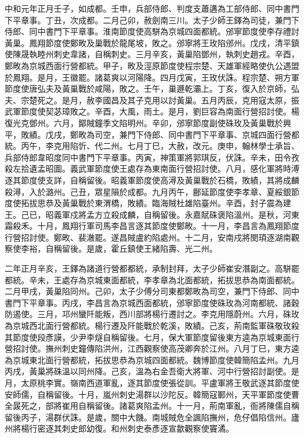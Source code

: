 \begin{pinyinscope}
 中和元年正月壬子，如成都。壬申，兵部侍郎、判度支蕭遘為工部侍郎、同中書門下平章事。丁丑，次成都。二月己卯，赦劍南三川。太子少師王鐸為司徒，兼門下侍郎、同中書門下平章事。淮南節度使高駢為京城四面都統。邠寧節度使李存禮討黃巢。鳳翔節度使鄭畋及巢戰於龍尾坡，敗之。邠寧將王玫陷邠州。戊戌，清平鎮使陳晟執睦州刺史韋諸，自稱刺史。三月辛亥，黃巢陷鄧州，執刺史趙戎。辛酉，鄭畋為京城西面行營都統。甲子，畋及涇原節度使程宗楚、天雄軍經略使仇公遇盟於鳳翔。是月，王徽罷。諸葛爽以河陽降。四月戊寅，王玫伏誅。程宗楚、朔方軍節度使唐弘夫及黃巢戰於咸陽，敗之。壬午，巢遯乾灞上。丁亥，復入於京師，弘夫、宗楚死之。是月，赦李國昌及其子克用以討黃巢。五月丙辰，克用寇太原，振武軍節度使契苾璋敗之。辛酉，大風，雨土。是月，劉巨容為南面行營招討使。楊復光克鄧州。六月，鄮賊鐘季文陷明州。辛卯，邠寧節度副使硃玫及黃巢戰於興平，敗績。戊戌，鄭畋為司空，兼門下侍郎、同中書門下平章事、京城四面行營都統。丙午，李克用陷忻、代二州。七月丁巳，大赦，改元。庚申，翰林學士承旨、兵部侍郎韋昭度同中書門下平章事。丙寅，神策軍將郭琪反，伏誅。辛未，田令孜殺左拾遺孟昭圖。義武軍節度使王處存為東南面行營招討使。八月，感化軍將時溥逐其節度使支詳，自稱留後。昭義軍節度使高潯及黃巢戰於石橋，敗績，其將成麟殺潯，入於潞州。己丑，眾星隕於成都。九月丙午，鄜延節度使李孝章、夏綏銀節度使拓拔思恭及黃巢戰於東渭橋，敗績。臨海賊杜雄陷臺州。辛酉，封子震為建王。己已，昭義軍戍將孟方立殺成麟，自稱留後。永嘉賦硃褒陷溫州。是秋，河東霜殺禾。十月，鳳翔行軍司馬李昌言逐其節度使鄭畋。十一月，李昌言為鳳翔節度行營招討使。鄭畋、裴澈罷。遂昌賊盧約陷處州。十二月，安南戍將閔頊逐湖南觀察使李裕，自稱留後。是歲，霍丘鎮使王緒陷壽、光二州。



 二年正月辛亥，王鐸為諸道行營都都統，承制封拜，太子少師崔安潛副之。高駢罷都統。辛未，王處存為京城東面都統，李孝章為北面都統，拓拔思恭為南面都統。二月甲戌，黃巢陷同州。己卯，太子少傅分司東都鄭畋為司空，兼門下侍郎、同中書門下平章事。丙戌，李昌言為京城西面都統，邠寧節度使硃玫為河南都統、諸穀防遏使。三月，邛州蠻阡能叛，西川部將楊行遷討之。李克用隱蔚州。六月，硃玫為京城西北面行營都統。楊行遷及阡能戰於乾溪，敗績。己亥，荊南監軍硃敬玫殺其節度使段彥謨，少尹李燧自稱留後。七月，保大軍節度留後東方逵為京城東面行營招討使。撫州刺史鐘傳陷洪州，江西觀察使高茂卿奔於江州。八月丁巳，東方逵為京城東北面行營都統，拓拔思恭為京城四面都統。魏博節度使韓簡陷孟州。九月丙戌，黃巢將硃溫以同州降。己亥，溫為右金吾衛大將軍、河中行營招討副使。是月，太原桃李實。嶺南西道軍亂，逐其節度使張從訓。平盧軍將王敬武逐其節度使安師儒，自稱留後。十月，嵐州刺史湯群以沙陀反。韓簡寇鄆州，天平軍節度使曹全晸死之，部將崔用自稱留後。諸葛爽陷孟州。十一月，荊南軍亂，衙將陳儒自稱留後丙子，湯群伏誅。是歲，關中大饑。南城賊危全諷陷撫州，危仔倡陷信州。廬州將楊行密逐其刺史郎幼復。和州刺史泰彥逐宣歙觀察使竇潏。




\end{pinyinscope}

